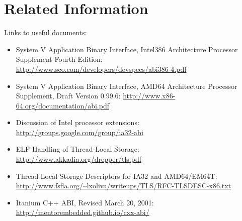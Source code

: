 \section{Related Information}

Links to useful documents:
\begin{itemize}
 \item System V Application Binary Interface, Intel386{\texttrademark} Architecture
       Processor Supplement Fourth Edition:
       \url{http://www.sco.com/developers/devspecs/abi386-4.pdf}
 \item System V Application Binary Interface, AMD64 Architecture Processor
       Supplement, Draft Version 0.99.6:
       \url{http://www.x86-64.org/documentation/abi.pdf}
 \item Discussion of Intel processor extensions:
       \url{http://groups.google.com/group/ia32-abi}
 \item ELF Handling of Thread-Local Storage:
       \url{http://www.akkadia.org/drepper/tls.pdf}
 \item Thread-Local Storage Descriptors for IA32 and AMD64/EM64T:
       \url{http://www.fsfla.org/~lxoliva/writeups/TLS/RFC-TLSDESC-x86.txt}
 \item Itanium C++ ABI, Revised March 20, 2001:
       \url{http://mentorembedded.github.io/cxx-abi/}
\end{itemize}

